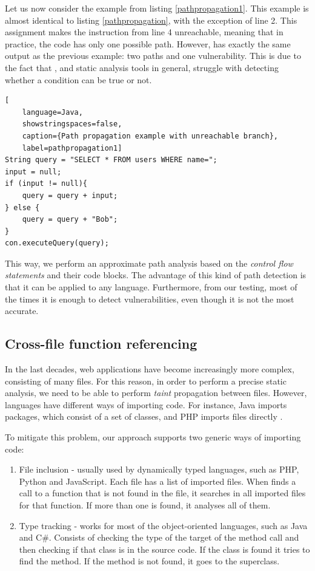 Let us now consider the example from listing \ref{pathpropagation1}. This example is almost identical to listing \ref{pathpropagation}, with the exception of line 2. This assignment makes the instruction from line 4 unreachable, meaning that in practice, the code has only one possible path. However, \toolname{} has exactly the same output as the previous example: two paths and one vulnerability. This is due to the fact that \toolname{}, and static analysis tools in general, struggle with detecting whether a condition can be true or not.

\begin{lstlisting}[
    language=Java,
    showstringspaces=false,
    caption={Path propagation example with unreachable branch},
    label=pathpropagation1] 
String query = "SELECT * FROM users WHERE name=";
input = null;
if (input != null){
    query = query + input;
} else {
    query = query + "Bob";
}
con.executeQuery(query);
\end{lstlisting}

This way, we perform an approximate path analysis based on the \textit{control flow statements} and their code blocks. The advantage of this kind of path detection is that it can be applied to any language. Furthermore, from our testing, most of the times it is enough to detect vulnerabilities, even though it is not the most accurate.


\subsection{Cross-file function referencing} 
In the last decades, web applications have become increasingly more complex, consisting of many files. For this reason, in order to perform a precise static analysis, we need to be able to perform \textit{taint} propagation between files. However, languages have different ways of importing code. For instance, Java imports packages, which consist of a set of classes, and PHP imports files directly \cite{rountev2004static,hills2014static}. 

To mitigate this problem, our approach supports two generic ways of importing code:
\begin{enumerate}
    \item File inclusion - usually used by dynamically typed languages, such as PHP, Python and JavaScript. Each file has a list of imported files. When \toolname{} finds a call to a function that is not found in the file, it searches in all imported files for that function. If more than one is found, it analyses all of them.
    
    \item Type tracking - works for most of the object-oriented languages, such as Java and C\#. Consists of checking the type of the target of the method call and then checking if that class is in the source code. If the class is found it tries to find the method. If the method is not found, it goes to the superclass.
\end{enumerate}

